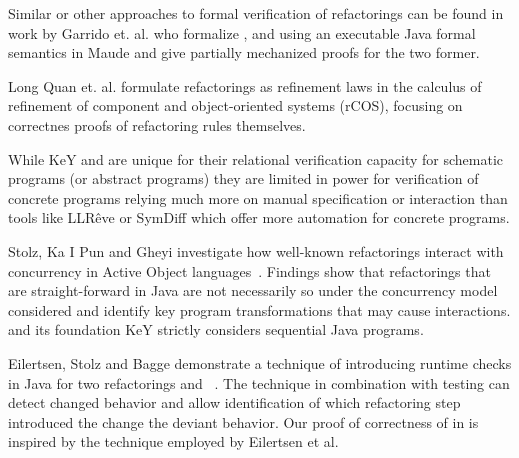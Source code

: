 Similar or other approaches to formal verification of refactorings can be found in work by
Garrido et. al. \cite{garrido2006formal} who formalize ,
 and  using an executable
Java formal semantics in Maude and give partially mechanized proofs for the two former.

Long Quan et. al. \cite{DBLP:conf/isola/QuanQL08} formulate refactorings as refinement
laws in the calculus of refinement of component and object-oriented systems (rCOS),
focusing on correctnes proofs of refactoring rules themselves.

While KeY and \Refinity{} are unique for their relational verification capacity for
schematic programs (or abstract programs) they are limited in power for verification
of concrete programs relying much more on manual specification or interaction \cite{DBLP:conf/aplas/Steinhofel20}
than tools like LLRêve \cite{DBLP:journals/jar/KieferKU18} or SymDiff \cite{DBLP:conf/cav/LahiriHKR12}
which offer more automation for concrete programs.


Stolz, Ka I Pun and Gheyi investigate how well-known refactorings interact with concurrency in Active Object languages~\cite{DBLP:conf/isola/StolzPG20}.
Findings show that refactorings that are straight-forward in Java are not necessarily so under the concurrency model considered and identify key
program transformations that may cause interactions.
\Refinity{} and its foundation KeY strictly considers sequential Java programs.

Eilertsen, Stolz and Bagge demonstrate a technique of introducing runtime checks in Java for two refactorings  and
~\cite{stolz:isolarefa}. The technique in combination with testing can detect changed behavior and allow identification
of which refactoring step introduced the change the deviant behavior.
Our proof of correctness of  in \Refinity{} is inspired by the technique employed by Eilertsen et al.


